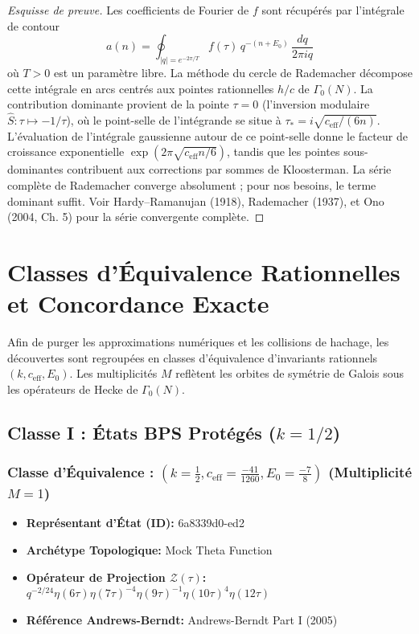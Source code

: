 \documentclass[11pt,twoside,openright]{book}
\begin{document}
\begin{proof}[Esquisse de preuve]
Les coefficients de Fourier de $f$ sont récupérés par l'intégrale de contour
\[ a(n) = \oint_{|q|=e^{-2\pi/T}} f(\tau)\, q^{-(n+E_0)}\, \frac{dq}{2\pi i q} \]
où $T > 0$ est un paramètre libre. La méthode du cercle de Rademacher décompose cette intégrale en arcs centrés aux pointes rationnelles $h/c$ de $\Gamma_0(N)$. La contribution dominante provient de la pointe $\tau = 0$ (l'inversion modulaire $\hat{S}: \tau \mapsto -1/\tau$), où le point-selle de l'intégrande se situe à $\tau_* = i\sqrt{c_{\text{eff}}/(6n)}$. L'évaluation de l'intégrale gaussienne autour de ce point-selle donne le facteur de croissance exponentielle $\exp(2\pi\sqrt{c_{\text{eff}} n/6})$, tandis que les pointes sous-dominantes contribuent aux corrections par sommes de Kloosterman. La série complète de Rademacher converge absolument ; pour nos besoins, le terme dominant suffit. Voir Hardy--Ramanujan (1918), Rademacher (1937), et Ono (2004, Ch. 5) pour la série convergente complète.
\end{proof}

\chapter{Classes d'Équivalence Rationnelles et Concordance Exacte}

Afin de purger les approximations numériques et les collisions de hachage, les découvertes sont regroupées en classes d'équivalence d'invariants rationnels $(k, c_{\text{eff}}, E_0)$. Les multiplicités $M$ reflètent les orbites de symétrie de Galois sous les opérateurs de Hecke de $\Gamma_0(N)$.

\section{Classe I : États BPS Protégés ($k = 1/2$)}

\subsection*{Classe d'Équivalence : $(k=\frac{1}{2}, c_{\text{eff}}=\frac{-41}{1260}, E_0=\frac{-7}{8})$ (Multiplicité $M=1$)}
\begin{itemize}
  \item \textbf{Représentant d'État (ID):} 6a8339d0-ed2
  \item \textbf{Archétype Topologique:} Mock Theta Function
  \item \textbf{Opérateur de Projection $\mathcal{Z}(\tau)$:} $q^{-2/24} \eta(6\tau) \eta(7\tau)^{-4} \eta(9\tau)^{-1} \eta(10\tau)^{4} \eta(12\tau)$
  \item \textbf{Référence Andrews-Berndt:} Andrews-Berndt Part I (2005)
\end{itemize}
\end{document}
